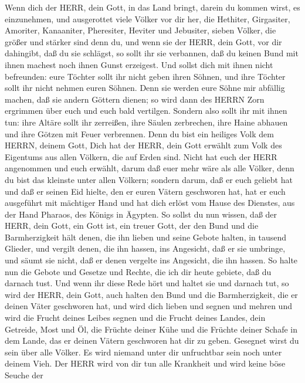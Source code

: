  Wenn dich der HERR, dein Gott, in das Land bringt, darein
du kommen wirst, es einzunehmen, und ausgerottet viele Völker vor dir
her, die Hethiter, Girgasiter, Amoriter, Kanaaniter, Pheresiter, Heviter
und Jebusiter, sieben Völker, die größer und stärker sind denn du,
 und wenn sie der HERR, dein Gott, vor dir dahingibt, daß du
sie schlägst, so sollt ihr sie verbannen, daß du keinen Bund mit ihnen
machest noch ihnen Gunst erzeigest.  Und sollst dich mit
ihnen nicht befreunden: eure Töchter sollt ihr nicht geben ihren Söhnen,
und ihre Töchter sollt ihr nicht nehmen euren Söhnen.  Denn
sie werden eure Söhne mir abfällig machen, daß sie andern Göttern
dienen; so wird dann des HERRN Zorn ergrimmen über euch und euch bald
vertilgen.  Sondern also sollt ihr mit ihnen tun: ihre
Altäre sollt ihr zerreißen, ihre Säulen zerbrechen, ihre Haine abhauen
und ihre Götzen mit Feuer verbrennen.  Denn du bist ein
heiliges Volk dem HERRN, deinem Gott, Dich hat der HERR, dein Gott
erwählt zum Volk des Eigentums aus allen Völkern, die auf Erden sind.
 Nicht hat euch der HERR angenommen und euch erwählt, darum
daß euer mehr wäre als alle Völker, denn du bist das kleinste unter
allen Völkern;  sondern darum, daß er euch geliebt hat und
daß er seinen Eid hielte, den er euren Vätern geschworen hat, hat er
euch ausgeführt mit mächtiger Hand und hat dich erlöst vom Hause des
Dienstes, aus der Hand Pharaos, des Königs in Ägypten.  So
sollst du nun wissen, daß der HERR, dein Gott, ein Gott ist, ein treuer
Gott, der den Bund und die Barmherzigkeit hält denen, die ihn lieben und
seine Gebote halten, in tausend Glieder,  und vergilt
denen, die ihn hassen, ins Angesicht, daß er sie umbringe, und säumt sie
nicht, daß er denen vergelte ins Angesicht, die ihn hassen.
 So halte nun die Gebote und Gesetze und Rechte, die ich
dir heute gebiete, daß du darnach tust.  Und wenn ihr diese
Rede hört und haltet sie und darnach tut, so wird der HERR, dein Gott,
auch halten den Bund und die Barmherzigkeit, die er deinen Väter
geschworen hat,  und wird dich lieben und segnen und mehren
und wird die Frucht deines Leibes segnen und die Frucht deines Landes,
dein Getreide, Most und Öl, die Früchte deiner Kühe und die Früchte
deiner Schafe in dem Lande, das er deinen Vätern geschworen hat dir zu
geben.  Gesegnet wirst du sein über alle Völker. Es wird
niemand unter dir unfruchtbar sein noch unter deinem Vieh. 
Der HERR wird von dir tun alle Krankheit und wird keine böse Seuche der

